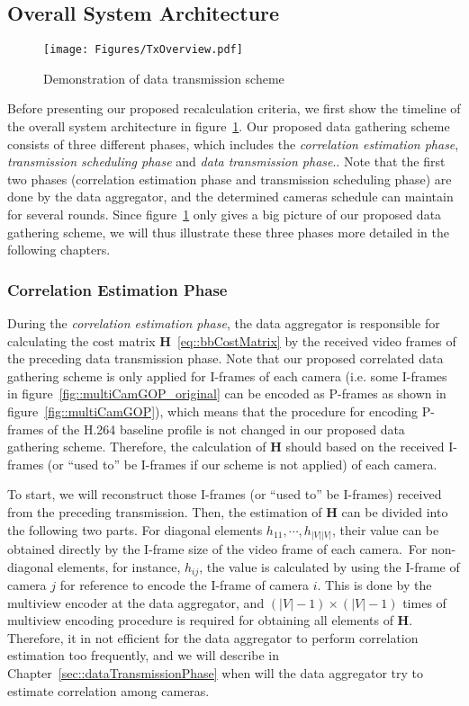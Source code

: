 {\subsection{Overall System Architecture}
%
\begin{figure}
\begin{center}
\texttt{[image: Figures/TxOverview.pdf]}
\caption{\label{fig::txOverview}Demonstration of data transmission scheme}
\end{center}
\end{figure}
%
Before presenting our proposed recalculation criteria, we first show the timeline of the overall system architecture in figure~\ref{fig::txOverview}.
Our proposed data gathering scheme consists of three different phases, which includes the \emph{correlation estimation phase}, \emph{transmission scheduling phase} and \emph{data transmission phase}..
Note that the first two phases (correlation estimation phase and transmission scheduling phase) are done by the data aggregator, and the determined cameras schedule can maintain for several rounds.
Since figure~\ref{fig::txOverview} only gives a big picture of our proposed data gathering scheme, we will thus illustrate these three phases more detailed in the following chapters. 
%
\subsubsection{Correlation Estimation Phase}
During the \emph{correlation estimation phase}, the data aggregator is responsible for calculating the cost matrix $\mathbf{H}$~\eqref{eq::bbCostMatrix} by the received video frames of the preceding data transmission phase.
Note that our proposed correlated data gathering scheme is only applied for I-frames of each camera (i.e. some I-frames in figure~\ref{fig::multiCamGOP_original} can be encoded as P-frames as shown in figure~\ref{fig::multiCamGOP}), which means that the procedure for encoding P-frames of the H.264 baseline profile is not changed in our proposed data gathering scheme.
Therefore, the calculation of $\mathbf{H}$ should based on the received I-frames (or ``used to'' be I-frames if our scheme is not applied) of each camera.

To start, we will reconstruct those I-frames (or ``used to'' be I-frames) received from the preceding transmission.
Then, the estimation of $\mathbf{H}$ can be divided into the following two parts.
For diagonal elements $h_{11},\cdots,h_{|V||V|}$, their value can be obtained directly by the I-frame size of the video frame of each camera.\
For non-diagonal elements, for instance, $h_{ij}$, the value is calculated by using the I-frame of camera $j$ for reference to encode the I-frame of camera $i$.
This is done by the multiview encoder at the data aggregator, and ${(|V|-1) \times (|V|-1)}$ times of multiview encoding procedure is required for obtaining all elements of $\mathbf{H}$.
Therefore, it in not efficient for the data aggregator to perform correlation estimation too frequently, and we will describe in Chapter~\ref{sec::dataTransmissionPhase} when will the data aggregator try to estimate correlation among cameras.
%
}
